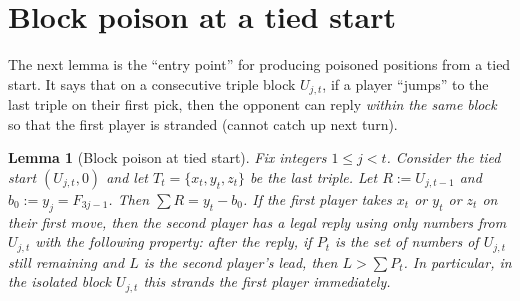 \documentclass[11pt]{article}
\newtheorem{lemma}[theorem]{Lemma}
\begin{document}
\section{Block poison at a tied start}

The next lemma is the ``entry point'' for producing poisoned positions from a tied start.
It says that on a consecutive triple block $U_{j,t}$, if a player ``jumps'' to the last triple on their first pick,
then the opponent can reply \emph{within the same block} so that the first player is stranded (cannot catch up next turn).

\begin{lemma}[Block poison at tied start]\label{lem:blockpoison}
Fix integers $1\le j<t$. Consider the tied start $(U_{j,t},0)$ and let $T_t=\{x_t,y_t,z_t\}$ be the last triple.
Let $R:=U_{j,t-1}$ and $b_0:=y_j=F_{3j-1}$. Then $\sum R=y_t-b_0$.
If the first player takes $x_t$ or $y_t$ or $z_t$ on their first move, then the second player has a legal reply using only numbers from $U_{j,t}$
with the following property: after the reply, if $P_t$ is the set of numbers of $U_{j,t}$ still remaining and $L$ is the second player's lead, then
$L>\sum P_t$. In particular, in the isolated block $U_{j,t}$ this strands the first player immediately.
\end{lemma}
\end{document}
